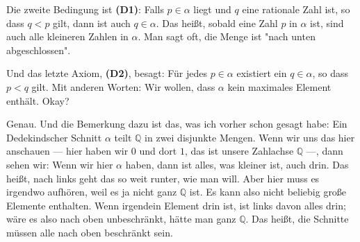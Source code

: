 \begin{spoken-clean}[00:24:50 - 00:27:12]
Die zweite Bedingung ist \textbf{(D1)}: Falls $p \in \alpha$ liegt und $q$ eine rationale Zahl ist, so dass $q < p$ gilt, dann ist auch $q \in \alpha$. Das heißt, sobald eine Zahl $p$ in $\alpha$ ist, sind auch alle kleineren Zahlen in $\alpha$. Man sagt oft, die Menge ist "nach unten abgeschlossen".

Und das letzte Axiom, \textbf{(D2)}, besagt: Für jedes $p \in \alpha$ existiert ein $q \in \alpha$, so dass $p < q$ gilt. Mit anderen Worten: Wir wollen, dass $\alpha$ kein maximales Element enthält. Okay?

Genau. Und die Bemerkung dazu ist das, was ich vorher schon gesagt habe: Ein Dedekindscher Schnitt $\alpha$ teilt $\mathbb{Q}$ in zwei disjunkte Mengen. Wenn wir uns das hier anschauen --- hier haben wir $0$ und dort $1$, das ist unsere Zahlachse $\mathbb{Q}$ ---, dann sehen wir: Wenn wir hier $\alpha$ haben, dann ist alles, was kleiner ist, auch drin. Das heißt, nach links geht das so weit runter, wie man will. Aber hier muss es irgendwo aufhören, weil es ja nicht ganz $\mathbb{Q}$ ist. Es kann also nicht beliebig große Elemente enthalten. Wenn irgendein Element drin ist, ist links davon alles drin; wäre es also nach oben unbeschränkt, hätte man ganz $\mathbb{Q}$. Das heißt, die Schnitte müssen alle nach oben beschränkt sein.
\end{spoken-clean}

